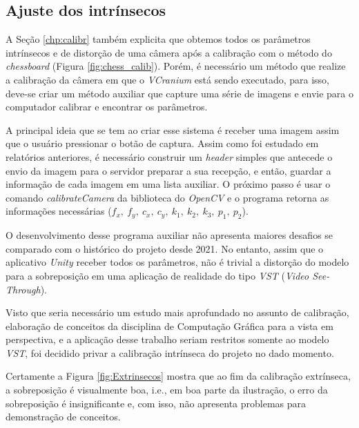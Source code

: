\subsection{Ajuste dos intrínsecos}

A Seção \ref{chp:calibr} também explicita que obtemos todos os parâmetros intrínsecos e de distorção de uma câmera após a calibração com o método do \textit{chessboard} (Figura \ref{fig:chess_calib}). Porém, é necessário um método que realize a calibração da câmera em que o \textit{VCranium} está sendo executado, para isso, deve-se criar um método auxiliar que capture uma série de imagens e envie para o computador calibrar e encontrar os parâmetros.

A principal ideia que se tem ao criar esse sistema é receber uma imagem assim que o usuário pressionar o botão de captura. Assim como foi estudado em relatórios anteriores, é necessário construir um \textit{header} simples que antecede o envio da imagem para o servidor preparar a sua recepção, e então, guardar a informação de cada imagem em uma lista auxiliar. O próximo passo é usar o comando \textit{calibrateCamera} da biblioteca do \textit{OpenCV} e o programa retorna as informações necessárias (\(f_x, \ f_y, \ c_x, \ c_y, \ k_1, \ k_2, \ k_3, \ p_1, \ p_2\)).

O desenvolvimento desse programa auxiliar não apresenta maiores desafios se comparado com o histórico do projeto desde 2021. No entanto, assim que o aplicativo \textit{Unity} receber todos os parâmetros, não é trivial a distorção do modelo para a sobreposição em uma aplicação de realidade do tipo \textit{VST} (\textit{Video See-Through}).

Visto que seria necessário um estudo mais aprofundado no assunto de calibração, elaboração de conceitos da disciplina de Computação Gráfica para a vista em perspectiva, e a aplicação desse trabalho seriam restritos somente ao modelo \textit{VST}, foi decidido privar a calibração intrínseca do projeto no dado momento.



Certamente a Figura \ref{fig:Extrinsecos} mostra que ao fim da calibração extrínseca, a sobreposição é visualmente boa, i.e., em boa parte da ilustração, o erro da sobreposição é insignificante e, com isso, não apresenta problemas para demonstração de conceitos.



    
